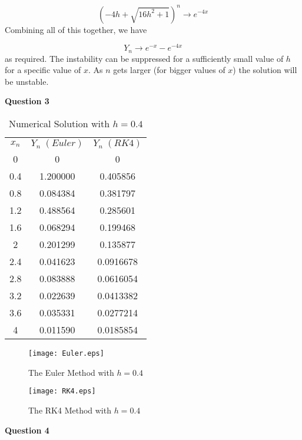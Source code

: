 \documentclass[14pt]{extarticle}
\begin{document}
\[\left(-4h+\sqrt{16h^2+1}\right)^n \rightarrow e^{-4x}\]
Combining all of this together, we have

\[Y_n \rightarrow e^{-x}-e^{-4x}\] 
as required. The instability can be suppressed for a sufficiently small value of $h$ for a specific value of $x$. As $n$ gets larger (for bigger values of $x$) the solution will be unstable.

\begin{center}
\textbf{Question 3}
\end{center}
\vspace{-5mm}

\begin{table}[h!]
\caption{Numerical Solution with $h = 0.4$}
\centering
\begin{tabular}{ccc}
\\
\textbf{$x_n$} & \textbf{$Y_n\;(Euler)$} & $Y_n\;(RK4)$ \\ [0.5ex]
0   &   0        &          0 \\
0.4 &   1.200000 &   0.405856 \\
0.8 &   0.084384 &   0.381797 \\
1.2 &   0.488564 &   0.285601 \\
1.6 &   0.068294 &   0.199468 \\
  2 &   0.201299 &   0.135877 \\
2.4 &   0.041623 &  0.0916678 \\
2.8 &   0.083888 &  0.0616054 \\
3.2 &   0.022639 &  0.0413382 \\
3.6 &   0.035331 &  0.0277214 \\
  4 &   0.011590 &  0.0185854 \\
\end{tabular}
\label{table:5}
\end{table}

\begin{figure}[htp!]
\centering
\texttt{[image: Euler.eps]}\\
\caption{The Euler Method with $h = 0.4$}
\label{figure:1}
\end{figure}

\begin{figure}[htp!]
\centering
\texttt{[image: RK4.eps]}\\
\caption{The RK4 Method with $h = 0.4$}
\label{figure:2}
\end{figure}

\pagebreak
\begin{center}
\textbf{Question 4}
\end{center}
\end{document}
